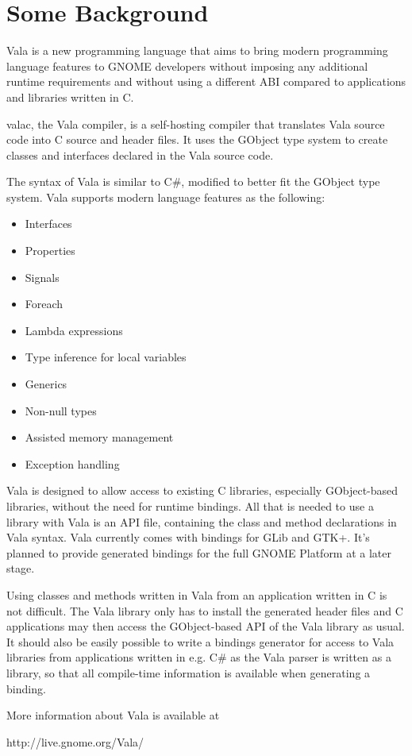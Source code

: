 \chapter{Some Background}
Vala is a new programming language that aims to bring modern programming language features to GNOME developers without imposing any additional runtime requirements and without using a different ABI compared to applications and libraries written in C.

valac, the Vala compiler, is a self-hosting compiler that translates Vala source code into C source and header files. It uses the GObject type system to create classes and interfaces declared in the Vala source code.

The syntax of Vala is similar to C\#, modified to better fit the GObject type system. Vala supports modern language features as the following:

\begin{itemize}
	\item Interfaces
	\item Properties
	\item Signals
	\item Foreach
	\item Lambda expressions
	\item Type inference for local variables
	\item Generics
	\item Non-null types
	\item Assisted memory management
	\item Exception handling
\end{itemize}

Vala is designed to allow access to existing C libraries, especially GObject-based libraries, without the need for runtime bindings. All that is needed to use a library with Vala is an API file, containing the class and method declarations in Vala syntax. Vala currently comes with bindings for GLib and GTK+. It's planned to provide generated bindings for the full GNOME Platform at a later stage.

Using classes and methods written in Vala from an application written in C is not difficult. The Vala library only has to install the generated header files and C applications may then access the GObject-based API of the Vala library as usual. It should also be easily possible to write a bindings generator for access to Vala libraries from applications written in e.g. C\# as the Vala parser is written as a library, so that all compile-time information is available when generating a binding.

More information about Vala is available at

	http://live.gnome.org/Vala/

